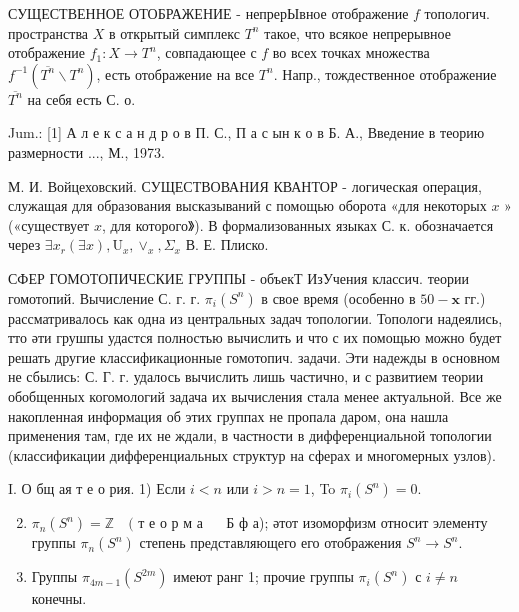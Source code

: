 \documentclass[10pt]{article}
\begin{document}
СУЩЕСТВЕННОЕ ОТОБРАЖЕНИЕ - непрерЫвное отображение $f$ топологич. пространства $X$ в открытый симплекс $T^{n}$ такое, что всякое непрерывное отображение $f_{1}: X \rightarrow T^{n}$, совпадающее с $f$ во всех точках множества $f^{-1}\left(\overline{T^{n}} \backslash T^{n}\right)$, есть отображение на все $T^{n}$. Напр., тождественное отображение $\overline{T^{n}}$ на себя есть С. о.



Jum.: [1] А л е к с а н д р о в П. С., П а с ын к о в Б. А., Введение в теорию размерности ..., М., 1973.



М. И. Войцеховский. СУЩЕСТВОВАНИЯ КВАНТОР - логическая операция, служащая для образования высказываний с помощью оборота «для некоторых $x$ » («существует $x$, для которого》). В формализованных языках С. к. обозначается через $\exists x_{r}(\exists x), \mathrm{U}_{x}, \vee_{x}, \Sigma_{x}$ В. Е. Плиско.



СФЕР ГОМОТОПИЧЕСКИЕ ГРУППЫ - объекТ ИзУчения классич. теории гомотопий. Вычисление С. г. г. $\pi_{i}\left(S^{n}\right)$ в свое время (особенно в $50-\mathbf{x}$ гг.) рассматривалось как одна из центральных задач топологии. Топологи надеялись, тто әти грушпы удастся полностью вычислить и что с их помощью можно будет решать другие классификационные гомотопич. задачи. Эти надежды в основном не сбылись: С. Г. г. удалось вычислить лишь частично, и с развитием теории обобщенных когомологий задача их вычисления стала менее актуальной. Все же накопленная информация об этих группах не пропала даром, она нашла применения там, где их не ждали, в частности в дифференциальной топологии (классификации дифференциальных структур на сферах и многомерных узлов).



I. О бщ ая т е о рия. 1) Если $i<n$ или $i>n=1$, To $\pi_{i}\left(S^{n}\right)=0$.



\begin{enumerate}

  \setcounter{enumi}{1}

  \item $\pi_{n}\left(S^{n}\right)=\mathbb{Z} \quad($ т е о р м а $\quad$ Б ф а); әтот изоморфизм относит элементу группы $\pi_{n}\left(S^{n}\right)$ степень представляющего его отображения $S^{n} \rightarrow S^{n}$.



  \item Группы $\pi_{4 m-1}\left(S^{2 m}\right)$ имеют ранг 1; прочие группы $\pi_{i}\left(S^{n}\right)$ с $i \neq n$ конечны.



\end{enumerate}
\end{document}
